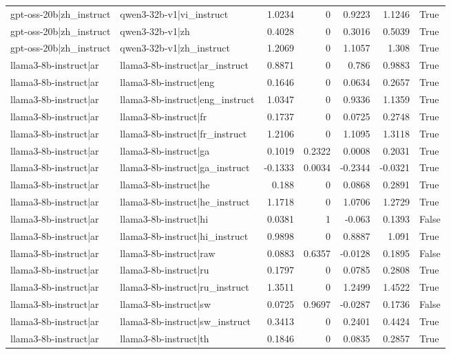 \begin{table}
\begin{tabular}{l l r r r r l}
gpt-oss-20b|zh_instruct & qwen3-32b-v1|vi_instruct & 1.0234 & 0 & 0.9223 & 1.1246 & True \\
gpt-oss-20b|zh_instruct & qwen3-32b-v1|zh & 0.4028 & 0 & 0.3016 & 0.5039 & True \\
gpt-oss-20b|zh_instruct & qwen3-32b-v1|zh_instruct & 1.2069 & 0 & 1.1057 & 1.308 & True \\
llama3-8b-instruct|ar & llama3-8b-instruct|ar_instruct & 0.8871 & 0 & 0.786 & 0.9883 & True \\
llama3-8b-instruct|ar & llama3-8b-instruct|eng & 0.1646 & 0 & 0.0634 & 0.2657 & True \\
llama3-8b-instruct|ar & llama3-8b-instruct|eng_instruct & 1.0347 & 0 & 0.9336 & 1.1359 & True \\
llama3-8b-instruct|ar & llama3-8b-instruct|fr & 0.1737 & 0 & 0.0725 & 0.2748 & True \\
llama3-8b-instruct|ar & llama3-8b-instruct|fr_instruct & 1.2106 & 0 & 1.1095 & 1.3118 & True \\
llama3-8b-instruct|ar & llama3-8b-instruct|ga & 0.1019 & 0.2322 & 0.0008 & 0.2031 & True \\
llama3-8b-instruct|ar & llama3-8b-instruct|ga_instruct & -0.1333 & 0.0034 & -0.2344 & -0.0321 & True \\
llama3-8b-instruct|ar & llama3-8b-instruct|he & 0.188 & 0 & 0.0868 & 0.2891 & True \\
llama3-8b-instruct|ar & llama3-8b-instruct|he_instruct & 1.1718 & 0 & 1.0706 & 1.2729 & True \\
llama3-8b-instruct|ar & llama3-8b-instruct|hi & 0.0381 & 1 & -0.063 & 0.1393 & False \\
llama3-8b-instruct|ar & llama3-8b-instruct|hi_instruct & 0.9898 & 0 & 0.8887 & 1.091 & True \\
llama3-8b-instruct|ar & llama3-8b-instruct|raw & 0.0883 & 0.6357 & -0.0128 & 0.1895 & False \\
llama3-8b-instruct|ar & llama3-8b-instruct|ru & 0.1797 & 0 & 0.0785 & 0.2808 & True \\
llama3-8b-instruct|ar & llama3-8b-instruct|ru_instruct & 1.3511 & 0 & 1.2499 & 1.4522 & True \\
llama3-8b-instruct|ar & llama3-8b-instruct|sw & 0.0725 & 0.9697 & -0.0287 & 0.1736 & False \\
llama3-8b-instruct|ar & llama3-8b-instruct|sw_instruct & 0.3413 & 0 & 0.2401 & 0.4424 & True \\
llama3-8b-instruct|ar & llama3-8b-instruct|th & 0.1846 & 0 & 0.0835 & 0.2857 & True \\

\end{tabular}
\end{table}

